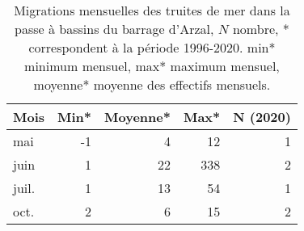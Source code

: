 \begin{table}[htbp]
\centering
\begin{tabular}{lrrrr}
  \hline
Mois & Min* & Moyenne* & Max* & N (2020) \\ 
  \hline
mai & -1 & 4 & 12 & 1 \\ 
  juin & 1 & 22 & 338 & 2 \\ 
  juil. & 1 & 13 & 54 & 1 \\ 
  oct. & 2 & 6 & 15 & 2 \\ 
   \hline
\end{tabular}
\caption{Migrations mensuelles des truites de mer dans la passe à bassins du barrage d'Arzal, $N$ nombre, * correspondent à
				la période 1996-2020. min* minimum mensuel, max* maximum mensuel, moyenne* moyenne des effectifs mensuels.} 
\label{table_trm_mois}
\end{table}
